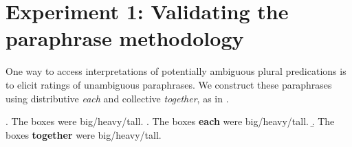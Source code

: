 \documentclass[linguex]{sp}
\begin{document}
%

\section{Experiment 1: Validating the paraphrase methodology}

One way to access interpretations of potentially ambiguous plural predications is to elicit ratings of unambiguous paraphrases. We construct these paraphrases using distributive \emph{each} and collective \emph{together}, as in \Next.

\ex. \label{bare}The boxes were big/heavy/tall.
\a.\label{each} The boxes \textbf{each} were big/heavy/tall.
\b.\label{together} The boxes \textbf{together} were big/heavy/tall.
\end{document}
